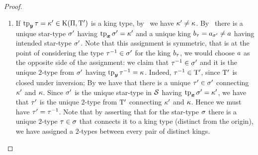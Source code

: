 \begin{proof}
\begin{description}
\begin{enumerate}
  \item If $\operatorname{tp}_{\bm{y}}\tau = {\kappa'} \in \mathrm{K}(\Pi,{\mathrm{T}'})$ is a king type,
  by~ we have ${\kappa'} \neq \kappa$. By~
  there is a unique star-type ${\sigma'}$ having $\operatorname{tp}_{\bm{x}}{\sigma'} = {\kappa'}$ and a unique
  king $b_{\tau} = a_{{\sigma'}} \neq a$ having intended star-type ${\sigma'}$.
  Note that this assignment is symmetric, that is at the point of considering
  the type $\tau^{-1} \in {\sigma'}$ for the king $b_{\tau}$, we would choose $a$ as
  the opposite side of the assignment: we claim that $\tau^{-1} \in
  {\sigma'}$ and it is the unique $2$-type from ${\sigma'}$ having $\operatorname{tp}_{\bm{y}}\tau^{-1}
  = \kappa$.
  Indeed, $\tau^{-1} \in {\mathrm{T}'}$, since ${\mathrm{T}'}$ is closed under inversion;
  By  we have that there is a unique ${\tau'} \in {\sigma'}$ connecting
  ${\kappa'}$ and $\kappa$. Since ${\sigma'}$ is the unique star-type in $\mathcal{S}$
  having $\operatorname{tp}_{\bm{x}}{\sigma'} = {\kappa'}$, we have that ${\tau'}$ is the unique $2$-type
  from ${\mathrm{T}'}$ connecting ${\kappa'}$ and $\kappa$. Hence we must have ${\tau'} =
  \tau^{-1}$.
  Note that by  asserting that for the star-type $\sigma$ there is a
  unique $2$-type $\tau \in \sigma$ that connects it to a king type (distinct
  from the origin), we have assigned a $2$-types between every pair of distinct
  kings.
  

\end{enumerate}
\end{description}
\end{proof}
